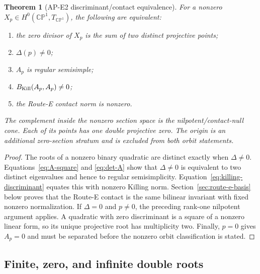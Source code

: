 \documentclass[11pt]{article}
\numberwithin{equation}{section}
\newcommand{\CP}{\mathbb{CP}}
\newtheorem{theorem}{Theorem}[section]
\begin{document}
\begin{theorem}[AP-E2 discriminant/contact equivalence]
\label{thm:ap-e2-main}
For a nonzero
\(X_p\in H^0(\CP^1,T_{\CP^1})\), the following are equivalent:
\begin{enumerate}
\item the zero divisor of \(X_p\) is the sum of two distinct projective
points;
\item \(\Delta(p)\ne0\);
\item \(A_p\) is regular semisimple;
\item \(B_{\rm Kill}(A_p,A_p)\ne0\);
\item the Route-E contact norm is nonzero.
\end{enumerate}
The complement inside the nonzero section space is the nilpotent/contact-null
cone.  Each of its points has one double projective zero.  The origin is an
additional zero-section stratum and is excluded from both orbit statements.
\end{theorem}

\begin{proof}
The roots of a nonzero binary quadratic are distinct exactly when
\(\Delta\ne0\).  Equations~\eqref{eq:A-square} and \eqref{eq:det-A} show that
\(\Delta\ne0\) is equivalent to two distinct eigenvalues and hence to regular
semisimplicity.  Equation~\eqref{eq:killing-discriminant} equates this with
nonzero Killing norm.  Section~\ref{sec:route-e-basis} below proves that the
Route-E contact is the same bilinear invariant with fixed nonzero
normalization.  If \(\Delta=0\) and \(p\ne0\), the preceding rank-one
nilpotent argument applies.  A quadratic with zero discriminant is a square
of a nonzero linear form, so its unique projective root has multiplicity two.
Finally, \(p=0\) gives \(A_p=0\) and must be separated before the nonzero
orbit classification is stated.
\end{proof}

\subsection{Finite, zero, and infinite double roots}
\end{document}
